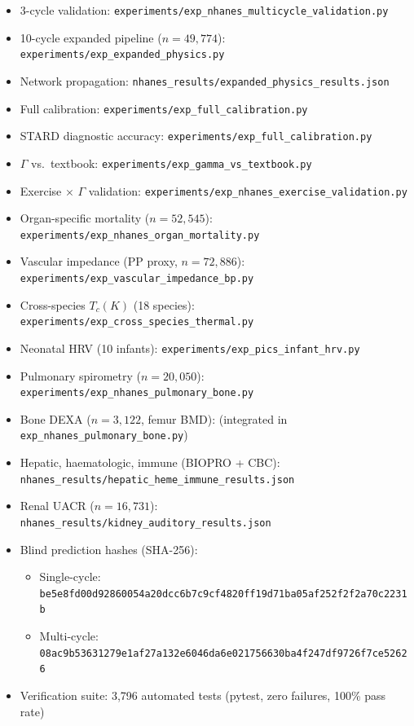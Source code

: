 \documentclass[aps,pre,twocolumn,superscriptaddress,floatfix]{revtex4-2}
\begin{document}
\begin{itemize}
  \item 3-cycle validation:
    \texttt{experiments/exp\_nhanes\_multicycle\_validation.py}
  \item 10-cycle expanded pipeline ($n = 49{,}774$):
    \texttt{experiments/exp\_expanded\_physics.py}
  \item Network propagation:
    \texttt{nhanes\_results/expanded\_physics\_results.json}
  \item Full calibration:
    \texttt{experiments/exp\_full\_calibration.py}
  \item STARD diagnostic accuracy:
    \texttt{experiments/exp\_full\_calibration.py}
  \item $\Gamma$ vs.\ textbook:
    \texttt{experiments/exp\_gamma\_vs\_textbook.py}
  \item Exercise $\times$ $\Gamma$ validation:
    \texttt{experiments/exp\_nhanes\_exercise\_validation.py}
  \item Organ-specific mortality ($n = 52{,}545$):
    \texttt{experiments/exp\_nhanes\_organ\_mortality.py}
  \item Vascular impedance (PP proxy, $n = 72{,}886$):
    \texttt{experiments/exp\_vascular\_impedance\_bp.py}
  \item Cross-species $T_c(K)$ (18 species):
    \texttt{experiments/exp\_cross\_species\_thermal.py}
  \item Neonatal HRV (10 infants):
    \texttt{experiments/exp\_pics\_infant\_hrv.py}
  \item Pulmonary spirometry ($n = 20{,}050$):
    \texttt{experiments/exp\_nhanes\_pulmonary\_bone.py}
  \item Bone DEXA ($n = 3{,}122$, femur BMD):
    (integrated in \texttt{exp\_nhanes\_pulmonary\_bone.py})
  \item Hepatic, haematologic, immune (BIOPRO + CBC):
    \texttt{nhanes\_results/hepatic\_heme\_immune\_results.json}
  \item Renal UACR ($n = 16{,}731$):
    \texttt{nhanes\_results/kidney\_auditory\_results.json}
  \item Blind prediction hashes (SHA-256):
    \begin{itemize}
      \item Single-cycle:
        \texttt{be5e8fd00d92860054a20dcc6b7c9cf4820ff19d71ba05af252f2f2a70c2231b}
      \item Multi-cycle:
        \texttt{08ac9b53631279e1af27a132e6046da6e021756630ba4f247df9726f7ce52626}
    \end{itemize}
  \item Verification suite: 3{,}796 automated tests (pytest,
    zero failures, 100\% pass rate)
\end{itemize}
\end{document}
